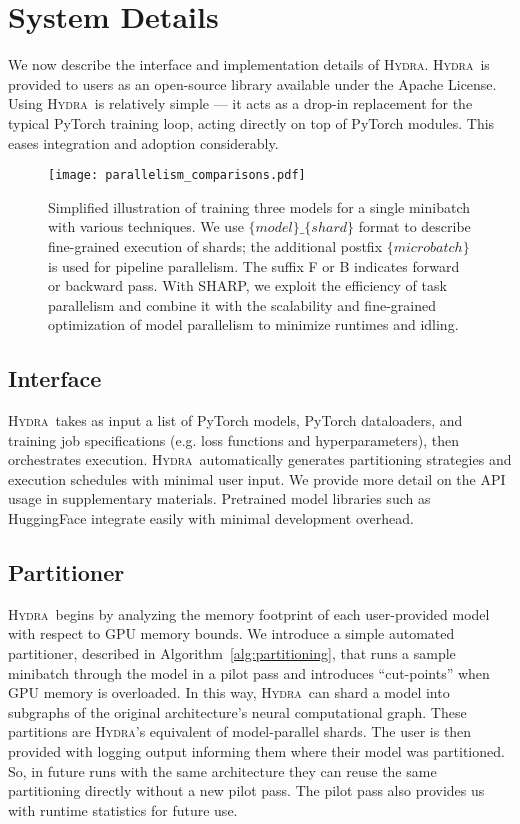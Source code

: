 \documentclass{article}
\newcommand{\system}{\textsc{Hydra}}
\begin{document}
\section{System Details}
\label{sec:details}
We now describe the interface and implementation details of \system. \system~is provided to users as an open-source library available under the Apache License. Using \system~is relatively simple --- it acts as a drop-in replacement for the typical PyTorch training loop, acting directly on top of PyTorch modules. This eases integration and adoption considerably.

\begin{figure}
\label{fig:sharp}
  \centering
  \texttt{[image: parallelism\_comparisons.pdf]}
  \caption{Simplified illustration of training three models for a single minibatch with various techniques. We use $\{model\}\_\{shard\}$ format to describe fine-grained execution of shards; the additional postfix $\{microbatch\}$ is used for pipeline parallelism. The suffix F or B indicates forward or backward pass. With SHARP, we exploit the efficiency of task parallelism and combine it with the scalability and fine-grained optimization of model parallelism to minimize runtimes and idling.}
\end{figure}

\subsection{Interface}

\system~takes as input a list of PyTorch models, PyTorch dataloaders, and training job specifications (e.g. loss functions and hyperparameters), then orchestrates execution. \system~automatically generates partitioning strategies and execution schedules with minimal user input. We provide more detail on the API usage in supplementary materials. Pretrained model libraries such as HuggingFace integrate easily with minimal development overhead.

\subsection{Partitioner}
\label{sec:partitioner}
\system~begins by analyzing the memory footprint of each user-provided model with respect to GPU memory bounds. We introduce a simple automated partitioner, described in Algorithm~\ref{alg:partitioning}, that runs a sample minibatch through the model in a pilot pass and introduces ``cut-points'' when GPU memory is overloaded. In this way, \system~can shard a model into subgraphs of the original architecture's neural computational graph. These partitions are \system's equivalent of model-parallel shards. The user is then provided with logging output informing them where their model was partitioned. So, in future runs with the same architecture they can reuse the same partitioning directly without a new pilot pass. The pilot pass also provides us with runtime statistics for future use.
\end{document}
